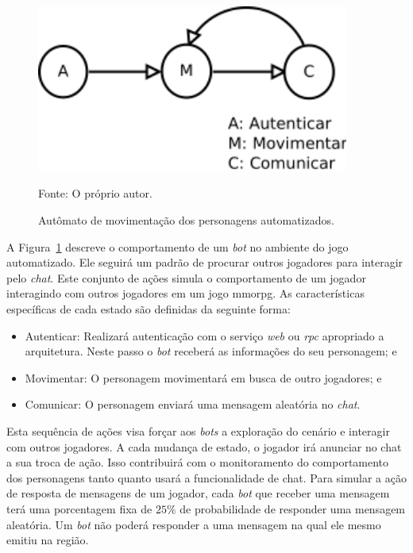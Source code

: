 \begin{figure}[htb!]
  \caption{Autômato de movimentação dos personagens automatizados.}
  \label{fig:movimentacao}
  \includegraphics[height=5.5cm]{img/cap3/movimentacao.png}
  \centering

  Fonte: O próprio autor.
\end{figure}

A Figura~\ref{fig:movimentacao} descreve o comportamento de um \textit{bot} no ambiente do jogo automatizado.
%
Ele seguirá um padrão de procurar outros jogadores para interagir pelo \textit{chat}.
%
Este conjunto de ações simula o comportamento de um jogador interagindo com outros jogadores em um jogo \ac{mmorpg}.
%
As características específicas de cada estado são definidas da seguinte forma:

\begin{itemize}
  \item Autenticar: Realizará autenticação com o serviço \textit{web} ou \textit{rpc} apropriado a arquitetura. Neste passo o \textit{bot} receberá as informações do seu personagem; e
  \item Movimentar: O personagem movimentará em busca de outro jogadores; e
  \item Comunicar: O personagem enviará uma mensagem aleatória no \textit{chat}.
\end{itemize}

Esta sequência de ações visa forçar aos \textit{bots} a exploração do cenário e interagir com outros jogadores.
%
A cada mudança de estado, o jogador irá anunciar no chat a sua troca de ação.
%
Isso contribuirá com o monitoramento do comportamento dos personagens tanto quanto usará a funcionalidade de chat.
%
Para simular a ação de resposta de mensagens de um jogador, cada \textit{bot} que receber uma mensagem terá uma porcentagem fixa de $25\%$ de probabilidade de responder uma mensagem aleatória.
%
Um \textit{bot} não poderá responder a uma mensagem na qual ele mesmo emitiu na região.

